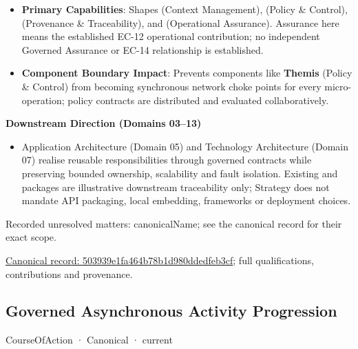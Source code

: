 \begin{itemize}


\item \textbf{Primary Capabilities}: Shapes \texttt{} (Context Management), \texttt{} (Policy \& Control), \texttt{} (Provenance \& Traceability), and \texttt{} (Operational Assurance). Assurance here means the established EC-12 operational contribution; no independent Governed Assurance or EC-14 relationship is established.

\item \textbf{Component Boundary Impact}: Prevents components like \textbf{Themis} (Policy \& Control) from becoming synchronous network choke points for every micro-operation; policy contracts are distributed and evaluated collaboratively.

\end{itemize}


\par\medskip\textbf{Downstream Direction (Domains 03–13)}\par


\begin{itemize}


\item Application Architecture (Domain 05) and Technology Architecture (Domain 07) realise reusable responsibilities through governed contracts while preserving bounded ownership, scalability and fault isolation. Existing \texttt{} and \texttt{} packages are illustrative downstream traceability only; Strategy does not mandate API packaging, local embedding, frameworks or deployment choices.

\end{itemize}

{\small Recorded unresolved matters: canonicalName; see the canonical record for their exact scope.}\par
{\footnotesize \href{../../../../continuum/strategy/course-of-action/503939e1fa464b78b1d980ddedfeb3cf.md}{Canonical record: 503939e1fa464b78b1d980ddedfeb3cf}; full qualifications, contributions and provenance.}\par
\subsection{Governed Asynchronous Activity Progression}

\label{element:a8ab09ee29454376bd45ba90b320d6ec}
{\small CourseOfAction · Canonical · current}\par

